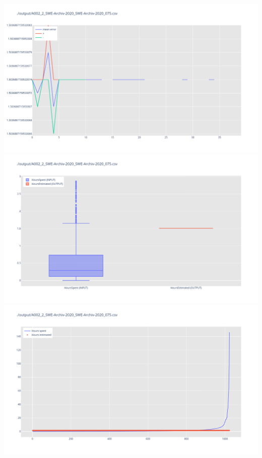 \includegraphics[width=\textwidth]{Scripts/output/A002_2_SWE-Archiv-2020_SWE-Archiv-2020_075.csv.error_distribution.png}
\includegraphics[width=\textwidth]{Scripts/output/A002_2_SWE-Archiv-2020_SWE-Archiv-2020_075.csv.png}
\includegraphics[width=\textwidth]{Scripts/output/A002_2_SWE-Archiv-2020_SWE-Archiv-2020_075.csv.scatter.png}
